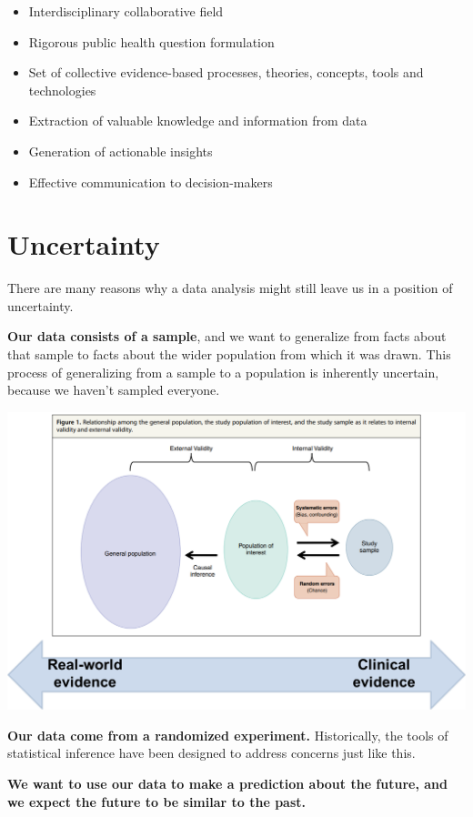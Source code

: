 \documentclass[
  letterpaper,
  DIV=11,
  numbers=noendperiod,
  oneside]{scrreprt}
\providecommand{\tightlist}{%
  \setlength{\itemsep}{0pt}\setlength{\parskip}{0pt}}\usepackage{longtable,booktabs,array}
\begin{document}
\begin{itemize}
\tightlist
\item
  Interdisciplinary collaborative field
\item
  Rigorous public health question formulation
\item
  Set of collective evidence-based processes, theories, concepts, tools
  and technologies
\item
  Extraction of valuable knowledge and information from data
\item
  Generation of actionable insights
\item
  Effective communication to decision-makers
\end{itemize}

\hypertarget{uncertainty}{%
\section{Uncertainty}\label{uncertainty}}

There are many reasons why a data analysis might still leave us in a
position of uncertainty.

\textbf{Our data consists of a sample}, and we want to generalize from
facts about that sample to facts about the wider population from which
it was drawn. This process of generalizing from a sample to a population
is inherently uncertain, because we haven't sampled everyone.

\includegraphics{images/paste-6D803DF2.png}

\textbf{Our data come from a randomized experiment.} Historically, the
tools of statistical inference have been designed to address concerns
just like this.

\textbf{We want to use our data to make a prediction about the future,
and we expect the future to be similar to the past.}
\end{document}
